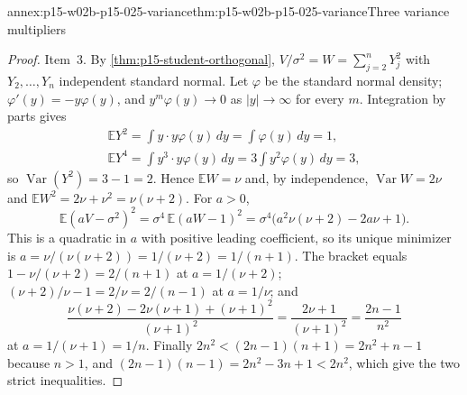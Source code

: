 \begin{annexitem}{annex:p15-w02b-p15-025-variance}{thm:p15-w02b-p15-025-variance}{Three variance multipliers}
\begin{proof}
Item~3. By \cref{thm:p15-student-orthogonal}, \(V/\sigma^2=W=\sum_{j=2}^nY_j^2\)
with \(Y_2,\ldots,Y_n\) independent standard normal. Let \(\varphi\) be
the standard normal density; \(\varphi'(y)=-y\varphi(y)\), and
\(y^m\varphi(y)\to0\) as \(|y|\to\infty\) for every \(m\). Integration
by parts gives
\[
 \begin{gathered}
 \mathbb EY^2=\int y\cdot y\varphi(y)\,dy=\int\varphi(y)\,dy=1,\\
 \mathbb EY^4=\int y^3\cdot y\varphi(y)\,dy=3\int y^2\varphi(y)\,dy=3,
 \end{gathered}
\]
so \(\operatorname{Var}(Y^2)=3-1=2\). Hence \(\mathbb EW=\nu\) and, by
independence, \(\operatorname{Var}W=2\nu\) and
\(\mathbb EW^2=2\nu+\nu^2=\nu(\nu+2)\). For \(a>0\),
\[
 \mathbb E(aV-\sigma^2)^2=\sigma^4\,\mathbb E(aW-1)^2
 =\sigma^4\bigl(a^2\nu(\nu+2)-2a\nu+1\bigr).
\]
This is a quadratic in \(a\) with positive leading coefficient, so its
unique minimizer is \(a=\nu/(\nu(\nu+2))=1/(\nu+2)=1/(n+1)\). The
bracket equals \(1-\nu/(\nu+2)=2/(n+1)\) at \(a=1/(\nu+2)\);
\((\nu+2)/\nu-1=2/\nu=2/(n-1)\) at \(a=1/\nu\); and
\[
 \frac{\nu(\nu+2)-2\nu(\nu+1)+(\nu+1)^2}{(\nu+1)^2}
 =\frac{2\nu+1}{(\nu+1)^2}=\frac{2n-1}{n^2}
\]
at \(a=1/(\nu+1)=1/n\). Finally \(2n^2<(2n-1)(n+1)=2n^2+n-1\) because
\(n>1\), and \((2n-1)(n-1)=2n^2-3n+1<2n^2\), which give the two strict
inequalities.
\end{proof}
\end{annexitem}

